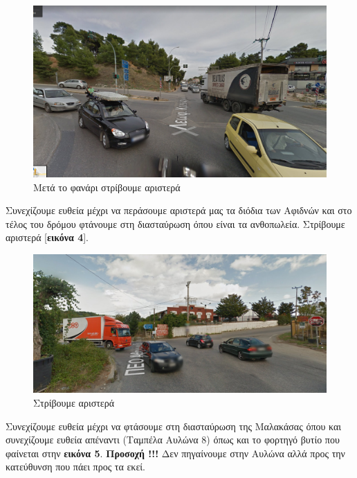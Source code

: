 \begin{figure}[hbp!]
	\centering
		\includegraphics[width=\textwidth]{images/athina-lamia/astefanos/astefanos2.PNG}
			\caption{Μετά το φανάρι στρίβουμε αριστερά}
\end{figure}
\break
Συνεχίζουμε ευθεία μέχρι να περάσουμε αριστερά μας τα διόδια των Αφιδνών και στο τέλος του δρόμου φτάνουμε στη διασταύρωση όπου είναι τα ανθοπωλεία. Στρίβουμε αριστερά [\textbf{εικόνα 4}].

\begin{figure}[hbp!]
	\centering
		\includegraphics[width=\textwidth]{images/athina-lamia/astefanos/astefanos3.PNG}
			\caption{Στρίβουμε αριστερά}
\end{figure}
Συνεχίζουμε ευθεία μέχρι να φτάσουμε στη διασταύρωση της Μαλακάσας όπου και συνεχίζουμε ευθεία απέναντι (Ταμπέλα Αυλώνα 8) όπως και το φορτηγό βυτίο που φαίνεται στην \textbf{εικόνα 5}. \textbf{Προσοχή !!!}
Δεν πηγαίνουμε στην Αυλώνα αλλά προς την κατεύθυνση που πάει προς τα εκεί.  


